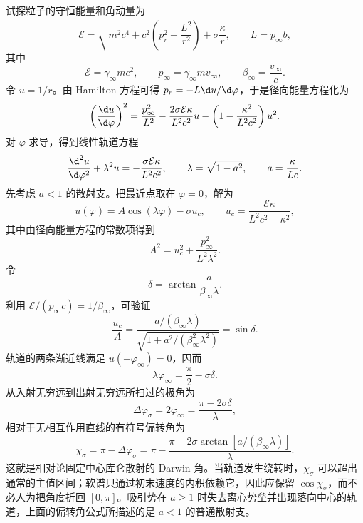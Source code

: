 试探粒子的守恒能量和角动量为
\begin{equation*}
	\mathcal E
	=\sqrt{m^2c^4+c^2\left(p_r^2+\frac{L^2}{r^2}\right)}
	+\sigma\frac{\kappa}{r},
	\qquad
	L=p_\infty b,
\end{equation*}
其中
\begin{equation*}
	\mathcal E=\gamma_\infty mc^2,
	\qquad
	p_\infty=\gamma_\infty mv_\infty,
	\qquad
	\beta_\infty=\frac{v_\infty}{c}.
\end{equation*}
令 $u=1/r$。由 Hamilton 方程可得 $p_r=-L\d u/\d\varphi$，于是径向能量方程化为
\begin{equation*}
	\left(\frac{\d u}{\d\varphi}\right)^2
	=\frac{p_\infty^2}{L^2}
	-\frac{2\sigma\mathcal E\kappa}{L^2c^2}u
	-\left(1-\frac{\kappa^2}{L^2c^2}\right)u^2.
\end{equation*}
对 $\varphi$ 求导，得到线性轨道方程
\begin{equation*}
	\frac{\d^2u}{\d\varphi^2}+\lambda^2u
	=-\frac{\sigma\mathcal E\kappa}{L^2c^2},
	\qquad
	\lambda=\sqrt{1-a^2},
	\qquad
	a=\frac{\kappa}{Lc}.
\end{equation*}
先考虑 $a<1$ 的散射支。把最近点取在 $\varphi=0$，解为
\begin{equation*}
	u(\varphi)=A\cos(\lambda\varphi)-\sigma u_c,
	\qquad
	u_c=\frac{\mathcal E\kappa}{L^2c^2-\kappa^2},
\end{equation*}
其中由径向能量方程的常数项得到
\begin{equation*}
	A^2=u_c^2+\frac{p_\infty^2}{L^2\lambda^2}.
\end{equation*}
令
\begin{equation*}
	\delta
	=\arctan\frac{a}{\beta_\infty\lambda}.
\end{equation*}
利用 $\mathcal E/(p_\infty c)=1/\beta_\infty$，可验证
\begin{equation*}
	\frac{u_c}{A}
	=\frac{a/(\beta_\infty\lambda)}
	{\sqrt{1+a^2/(\beta_\infty^2\lambda^2)}}
	=\sin\delta.
\end{equation*}
轨道的两条渐近线满足 $u(\pm\varphi_\infty)=0$，因而
\begin{equation*}
	\lambda\varphi_\infty=\frac{\pi}{2}-\sigma\delta.
\end{equation*}
从入射无穷远到出射无穷远所扫过的极角为
\begin{equation*}
	\Delta\varphi_\sigma
	=2\varphi_\infty
	=\frac{\pi-2\sigma\delta}{\lambda},
\end{equation*}
相对于无相互作用直线的有符号偏转角为
\begin{equation*}
	\chi_\sigma
	=\pi-\Delta\varphi_\sigma
	=\pi-\frac{\pi-2\sigma\arctan[a/(\beta_\infty\lambda)]}{\lambda}.
\end{equation*}
这就是相对论固定中心库仑散射的 Darwin 角。当轨道发生绕转时，$\chi_\sigma$ 可以超出通常的主值区间；软谱只通过初末速度的内积依赖它，因此应保留 $\cos\chi_\sigma$，而不必人为把角度折回 $[0,\pi]$。吸引势在 $a\geq1$ 时失去离心势垒并出现落向中心的轨道，上面的偏转角公式所描述的是 $a<1$ 的普通散射支。

